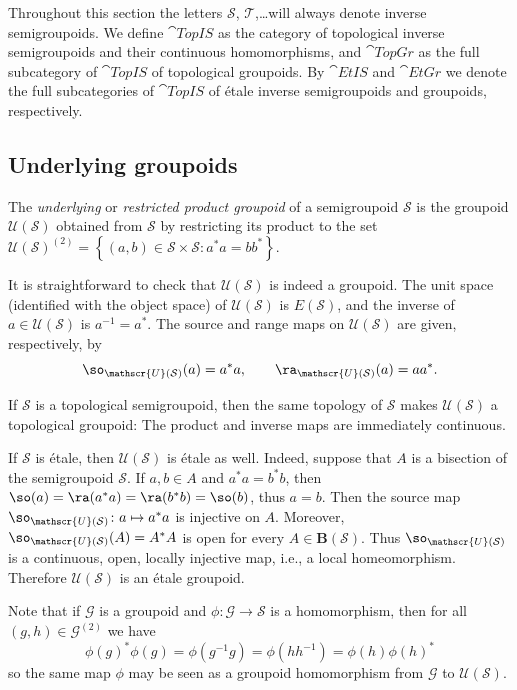 Throughout this section the letters $\mathcal{S}$, $\mathcal{T}$,\ldots will always denote inverse semigroupoids. We define $\cat{TopIS}$ as the category of topological inverse semigroupoids and their continuous homomorphisms, and $\cat{TopGr}$ as the full subcategory of $\cat{TopIS}$ of topological groupoids. By $\cat{EtIS}$ and $\cat{EtGr}$ we denote the full subcategories of $\cat{TopIS}$ of étale inverse semigroupoids and groupoids, respectively.

\subsection{Underlying groupoids}
\begin{definition}
The \emph{underlying} or \emph{restricted product groupoid} of a semigroupoid $\mathcal{S}$ is the groupoid $\mathscr{U}(\mathcal{S})$ obtained from $\mathcal{S}$ by restricting its product to the set $\mathscr{U}(\mathcal{S})^{(2)}=\left\{(a,b)\in \mathcal{S}\times \mathcal{S}:a^*a=bb^*\right\}$.
\end{definition}

It is straightforward to check that $\mathscr{U}(\mathcal{S})$ is indeed a groupoid. The unit space (identified with the object space) of $\mathscr{U}(\mathcal{S})$ is $E(\mathcal{S})$, and the inverse of $a\in\mathscr{U}(\mathcal{S})$ is $a^{-1}=a^*$. The source and range maps on $\mathscr{U}(\mathcal{S})$ are given, respectively, by
\[\so_{\mathscr{U}(\mathcal{S})}(a)=a^*a,\qquad\ra_{\mathscr{U}(\mathcal{S})}(a)=aa^*.\]

If $\mathcal{S}$ is a topological semigroupoid, then the same topology of $\mathcal{S}$ makes $\mathscr{U}(\mathcal{S})$ a topological groupoid: The product and inverse maps are immediately continuous.

If $\mathcal{S}$ is étale, then $\mathscr{U}(\mathcal{S})$ is étale as well. Indeed, suppose that $A$ is a bisection of the semigroupoid $\mathcal{S}$. If $a,b\in A$ and $a^*a=b^*b$, then $\so(a)=\ra(a^*a)=\ra(b^*b)=\so(b)$, thus $a=b$. Then the source map $\so_{\mathscr{U}(\mathcal{S})}\colon a\mapsto a^*a$ is injective on $A$. Moreover, $\so_{\mathscr{U}(\mathcal{S})}(A)=A^*A$ is open for every $A\in\mathbf{B}(\mathcal{S})$. Thus $\so_{\mathscr{U}(\mathcal{S})}$ is a continuous, open, locally injective map, i.e., a local homeomorphism. Therefore $\mathscr{U}(\mathcal{S})$ is an étale groupoid.

Note that if $\mathcal{G}$ is a groupoid and $\phi\colon\mathcal{G}\to\mathcal{S}$ is a homomorphism, then for all $(g,h)\in\mathcal{G}^{(2)}$ we have
\[\phi(g)^*\phi(g)=\phi(g^{-1}g)=\phi(hh^{-1})=\phi(h)\phi(h)^*\]
so the same map $\phi$ may be seen as a groupoid homomorphism from $\mathcal{G}$ to $\mathscr{U}(\mathcal{S})$.


